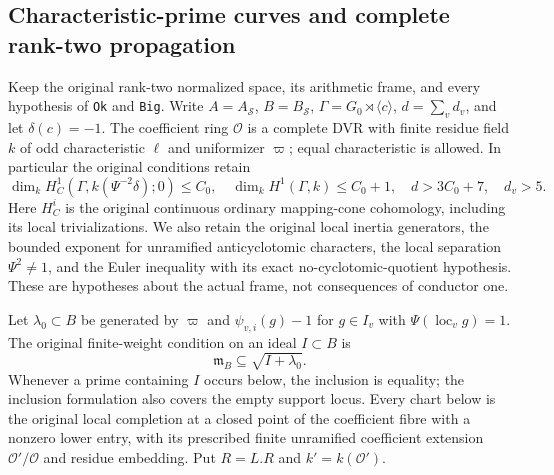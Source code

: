 \subsection{Characteristic-prime curves and complete rank-two propagation}
\label{subsec:selmer-support-rank-two}

Keep the original rank-two normalized space, its arithmetic frame,
and every hypothesis of \texttt{Ok} and \texttt{Big}.
Write $A=A_{\mathscr S}$, $B=B_{\mathscr S}$,
$\Gamma=G_0\rtimes\langle c\rangle$, $d=\sum_vd_v$, and let
$\delta(c)=-1$.  The coefficient ring $\mathcal O$ is a complete
DVR with finite residue field $k$ of odd characteristic $\ell$ and
uniformizer $\varpi$; equal characteristic is allowed.  In particular
the original conditions retain
\begin{equation}\label{eq:ranktwo-original-budgets}
 \dim_k H^1_C(\Gamma,k(\Psi^{-2}\delta);0)\le C_0,
 \quad \dim_kH^1(\Gamma,k)\le C_0+1,
 \quad d>3C_0+7,\quad d_v>5.
\end{equation}
Here $H^i_C$ is the original continuous ordinary mapping-cone
cohomology, including its local trivializations.  We also retain the
original local inertia generators, the bounded exponent for unramified
anticyclotomic characters, the local separation $\Psi^2\ne1$, and
the Euler inequality with its exact no-cyclotomic-quotient hypothesis.
These are hypotheses about the actual frame, not consequences of
conductor one.\cite{support-ranktwo-source}

Let $\lambda_0\subset B$ be generated by $\varpi$ and
$\psi_{v,i}(g)-1$ for $g\in I_v$ with $\Psi(\operatorname{loc}_v g)=1$.
The original finite-weight condition on an ideal $I\subset B$ is
\begin{equation}\label{eq:ranktwo-finlam}
                  \mathfrak m_B\subseteq\sqrt{I+\lambda_0}.
\end{equation}
Whenever a prime containing $I$ occurs below, the inclusion is equality;
the inclusion formulation also covers the empty support locus.
Every chart below is the original local completion at a closed point
of the coefficient fibre with a nonzero lower entry, with its prescribed
finite unramified coefficient extension $\mathcal O'/\mathcal O$
and residue embedding.  Put $R=L.R$ and $k'=k(\mathcal O')$.

